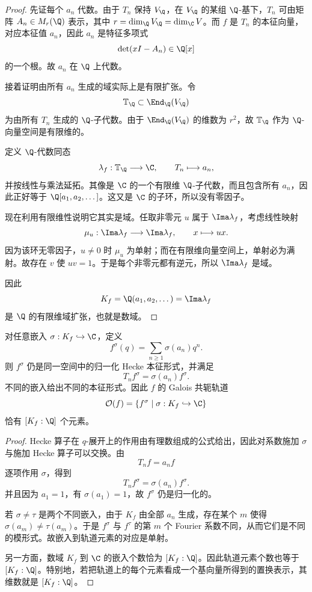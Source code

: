 \begin{proof}
先证每个 $a_n$ 代数。由于 $T_n$ 保持 $V_{\Q}$，在 $V_{\Q}$ 的某组 $\Q$-基下，$T_n$ 可由矩阵 $A_n\in M_r(\Q)$ 表示，其中 $r=\dim_{\Q}V_{\Q}=\dim_{\C}V$。而 $f$ 是 $T_n$ 的本征向量，对应本征值 $a_n$，因此 $a_n$ 是特征多项式
\[
\det(xI-A_n)\in\Q[x]
\]
的一个根。故 $a_n$ 在 $\Q$ 上代数。

接着证明由所有 $a_n$ 生成的域实际上是有限扩张。令
\[
\mathbb{T}_{\Q}\subset \End_{\Q}(V_{\Q})
\]
为由所有 $T_n$ 生成的 $\Q$-子代数。由于 $\End_{\Q}(V_{\Q})$ 的维数为 $r^2$，故 $\mathbb{T}_{\Q}$ 作为 $\Q$-向量空间是有限维的。

定义 $\Q$-代数同态
\[
\lambda_f:\mathbb{T}_{\Q}\longrightarrow \C,
\qquad T_n\longmapsto a_n,
\]
并按线性与乘法延拓。其像是 $\C$ 的一个有限维 $\Q$-子代数，而且包含所有 $a_n$，因此正好等于 $\Q[a_1,a_2,\dots]$。这又是 $\C$ 的子环，所以没有零因子。

现在利用有限维性说明它其实是域。任取非零元 $u$ 属于 $\Ima\lambda_f$，考虑线性映射
\[
\mu_u:\Ima\lambda_f\longrightarrow \Ima\lambda_f,
\qquad x\longmapsto ux.
\]
因为该环无零因子，$u\ne0$ 时 $\mu_u$ 为单射；而在有限维向量空间上，单射必为满射。故存在 $v$ 使 $uv=1$。于是每个非零元都有逆元，所以 $\Ima\lambda_f$ 是域。

因此
\[
K_f=\Q(a_1,a_2,\dots)=\Ima\lambda_f
\]
是 $\Q$ 的有限维域扩张，也就是数域。
\end{proof}

\begin{proposition}
对任意嵌入 $\sigma:K_f\hookrightarrow \C$，定义
\[
f^\sigma(q)=\sum_{n\ge1}\sigma(a_n)q^n.
\]
则 $f^\sigma$ 仍是同一空间中的归一化 Hecke 本征形式，并满足
\[
T_n f^\sigma=\sigma(a_n)f^\sigma.
\]
不同的嵌入给出不同的本征形式。因此 $f$ 的 Galois 共轭轨道
\[
\mathcal O(f)=\{f^\sigma\mid \sigma:K_f\hookrightarrow\C\}
\]
恰有 $[K_f:\Q]$ 个元素。
\end{proposition}

\begin{proof}
Hecke 算子在 $q$-展开上的作用由有理数组成的公式给出，因此对系数施加 $\sigma$ 与施加 Hecke 算子可以交换。由
\[
T_n f=a_n f
\]
逐项作用 $\sigma$，得到
\[
T_n f^\sigma=\sigma(a_n)f^\sigma.
\]
并且因为 $a_1=1$，有 $\sigma(a_1)=1$，故 $f^\sigma$ 仍是归一化的。

若 $\sigma\ne\tau$ 是两个不同嵌入，由于 $K_f$ 由全部 $a_n$ 生成，存在某个 $m$ 使得 $\sigma(a_m)\ne\tau(a_m)$。于是 $f^\sigma$ 与 $f^\tau$ 的第 $m$ 个 Fourier 系数不同，从而它们是不同的模形式。故嵌入到轨道元素的对应是单射。

另一方面，数域 $K_f$ 到 $\C$ 的嵌入个数恰为 $[K_f:\Q]$。因此轨道元素个数也等于 $[K_f:\Q]$。特别地，若把轨道上的每个元素看成一个基向量所得到的置换表示，其维数就是 $[K_f:\Q]$。
\end{proof}

